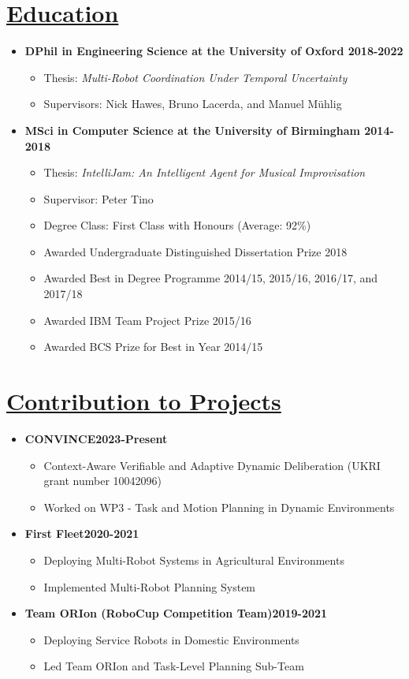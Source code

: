 \documentclass[11pt]{article}
\begin{document}
\section*{\uline{Education}}
\begin {itemize}
\item \textbf{DPhil in Engineering Science at the University of Oxford \hfill 2018-2022} 
\begin{itemize}
    \item Thesis: \emph{Multi-Robot Coordination Under Temporal Uncertainty}
    \item Supervisors: Nick Hawes, Bruno Lacerda, and Manuel M{\"u}hlig
\end{itemize}
			
\item \textbf{MSci in Computer Science at the University of Birmingham \hfill 2014-2018}
\begin{itemize}
\item Thesis: \emph{IntelliJam: An Intelligent Agent for Musical Improvisation}
\item Supervisor: Peter Tino
\item Degree Class: First Class with Honours (Average: 92\%)
\item Awarded Undergraduate Distinguished Dissertation Prize 2018
\item Awarded Best in Degree Programme 2014/15, 2015/16, 2016/17, and 2017/18
\item Awarded IBM Team Project Prize 2015/16
\item Awarded BCS Prize for Best in Year 2014/15
\end{itemize}
\end{itemize}

\section*{\underline{Contribution to Projects}}
\begin{itemize}
\item \textbf{CONVINCE\hfill 2023-Present}
\begin{itemize}
\item Context-Aware Verifiable and Adaptive Dynamic Deliberation (UKRI grant number 10042096)
\item Worked on WP3 - Task and Motion Planning in Dynamic Environments 
\end{itemize}
\item \textbf{First Fleet\hfill 2020-2021}
\begin{itemize}
\item Deploying Multi-Robot Systems in Agricultural Environments
\item Implemented Multi-Robot Planning System
\end{itemize}
\item \textbf{Team ORIon (RoboCup Competition Team)\hfill 2019-2021}
\begin{itemize}
\item Deploying Service Robots in Domestic Environments
\item Led Team ORIon and Task-Level Planning Sub-Team
\end{itemize}
\end{itemize}
\end{document}
